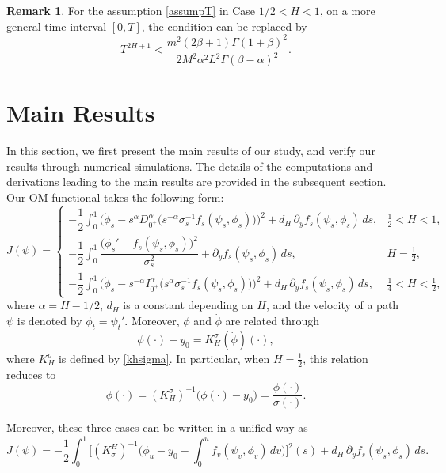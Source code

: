 \documentclass{article}
\theoremstyle{definition}  %
\newtheorem{remark}{Remark}
\theoremstyle{plain}  %
\begin{document}
\begin{remark}
For the assumption \eqref{assumpT} in Case $1/2 < H < 1$, on a more general time interval $[0,T]$, the condition can be replaced by
\[
T^{2H+1}
<
\frac{m^2 (2\beta+1)\Gamma(1+\beta)^2}
     {2M^2 \alpha^2 L^2 \Gamma(\beta-\alpha)^2}.
\]

\end{remark}






\section{Main Results}
In this section, we first present the main results of our study, and verify our results through numerical simulations.
 The details of the computations and derivations leading to the main results are provided in the subsequent section.
Our OM functional takes the following form:
\[
J(\psi)=
\begin{cases}
-\dfrac{1}{2}\displaystyle\int_0^1 
\Big(
\dot{\phi}_s
- s^{\alpha} D_{0^+}^\alpha \big(s^{-\alpha} 
\sigma_s^{-1} f_s(\psi_s,\phi_s)\big)
\Big)^2 
+ d_H \,\partial_y f_s(\psi_s,\phi_s) \, ds, 
& \tfrac{1}{2}<H<1, \\[2.2em]
-\dfrac{1}{2}\displaystyle\int_0^1 
\dfrac{
\big(
\phi_s'
-  f_s(\psi_s,\phi_s)
\big)^2}{\sigma_s^2} 
+  \partial_y f_s(\psi_s,\phi_s) \, ds,
& H=\tfrac{1}{2}, \\[2.2em]
-\dfrac{1}{2}\displaystyle\int_0^1 
\Big(
\dot{\phi}_s
- s^{-\alpha} I_{0^+}^\alpha \big(s^{\alpha} 
\sigma_s^{-1} f_s(\psi_s,\phi_s)\big)
\Big)^2 
+ d_H \,\partial_y f_s(\psi_s,\phi_s) \, ds,
& \tfrac{1}{4}<H<\tfrac{1}{2},
\end{cases}
\]
where \(\alpha = H - 1/2\), \(d_H\) is a constant depending on \(H\), and the velocity of a path \(\psi\) is denoted by \(\phi_t = \psi_t'\). Moreover, $\phi$ and $\dot{\phi}$ are related through
\begin{equation*}
    \phi(\cdot) - y_0 = K_H^\sigma(\dot{\phi})(\cdot),
\end{equation*}
where $K_H^\sigma$ is defined by \eqref{khsigma}. In particular, when $H=\tfrac{1}{2}$, this relation reduces to
\begin{equation*}
    \dot{\phi}(\cdot) = (K_H^\sigma)^{-1}\bigl(\phi(\cdot) - y_0\bigr)
    = \frac{\phi(\cdot)}{\sigma(\cdot)}.
\end{equation*}

Moreover, these three cases can be written in a unified way as
\begin{equation}\label{mr}
    J(\psi)
    = -\frac{1}{2}\int_0^1  
    \Big[
        (K^H_\sigma)^{-1} 
        \Big(
            \phi_u - y_0 - \int_0^u f_v(\psi_v,\phi_v)\,dv
        \Big)
    \Big]^2 (s)
    + d_H \,\partial_y f_s(\psi_s,\phi_s)\,ds.
\end{equation}
\end{document}
